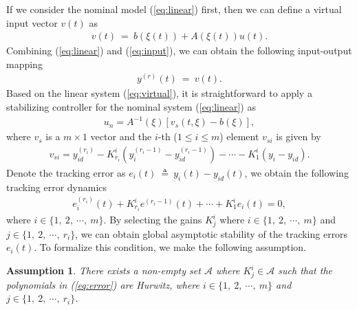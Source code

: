 \documentclass[twoside,leqno,onecolumn]{article}
\newtheorem{assumption}{Assumption}
\begin{document}
If we consider the nominal model (\ref{eq:linear}) first, then we
can define a virtual input vector $v(t)$ as
\begin{align}
\label{eq:input} v(t) ~=~ b(\xi(t)) + A (\xi(t)) u(t).
\end{align}
Combining (\ref{eq:linear}) and (\ref{eq:input}), we can obtain
the following input-output mapping
\begin{align}
\label{eq:virtual} y^{(r)}(t) ~=~v(t).
\end{align}
Based on the linear system (\ref{eq:virtual}), it is
straightforward to apply a stabilizing controller for the nominal
system (\ref{eq:linear}) as
\begin{align}
\label{eq:norm} u_{n} = A^{-1}(\xi) \left[v_{s}(t,\xi) -
b(\xi)\right],
\end{align}
where $v_s$ is a $m\times1$ vector and the $i$-th ($1\leq i \leq
m$) element $v_{si}$ is given by
\begin{align}
\label{eq:feedback} v_{si} = y_{id}^{(r_i)} -
K_{r_i}^{i}(y_i^{(r_i-1)}-y_{id}^{(r_i-1)})-\cdots-K_{1}^{i}(y_i-y_{id}).
\end{align}
Denote the tracking error as $e_i(t) ~\triangleq~ y_i(t)-
y_{id}(t)$, we obtain  the following tracking error dynamics
\begin{align}
\label{eq:error} e_i^{(r_i)}(t) +  K^i_{r_i}e^{(r_i-1)}(t) +
\cdots + K^i_1e_i(t) = 0,
\end{align}
where $i \in \{1,~2,~\cdots,~m\}$. By selecting the gains $K^i_j$
where $i \in \{1,~2,~\cdots,~m\}$ and $j\in\{1,~2,~\cdots,~r_i\}$,
we can obtain global asymptotic stability of the tracking errors
$e_i(t)$. To formalize this condition, we make the following
assumption.

\begin{assumption}
There exists a non-empty set $\mathcal{A}$ where
$K^i_j\in\mathcal{A} $ such that the polynomials in
(\ref{eq:error}) are Hurwitz, where $i \in \{1,~2,~\cdots,~m\}$
and $j\in\{1,~2,~\cdots,~r_i\}$.
\end{assumption}
\end{document}
